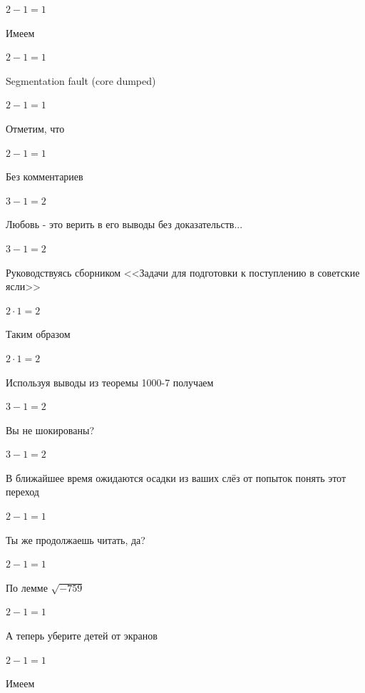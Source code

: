 \documentclass[12pt,a4paper,fleqn]{article}
\begin{document}
\begin{center}$2-1 = 1$\end{center}
Имеем

\begin{center}$2-1 = 1$\end{center}
Segmentation fault (core dumped)

\begin{center}$2-1 = 1$\end{center}
Отметим, что

\begin{center}$2-1 = 1$\end{center}
Без комментариев\cite{link4}

\begin{center}$3-1 = 2$\end{center}
Любовь - это верить в его выводы без доказательств...

\begin{center}$3-1 = 2$\end{center}
Руководствуясь сборником <<Задачи для подготовки к поступлению в советские ясли>>\cite{link1}

\begin{center}$2 \cdot 1 = 2$\end{center}
Таким образом

\begin{center}$2 \cdot 1 = 2$\end{center}
Используя выводы из теоремы 1000-7 получаем

\begin{center}$3-1 = 2$\end{center}
Вы не шокированы?\cite{link3}

\begin{center}$3-1 = 2$\end{center}
В ближайшее время ожидаются осадки из ваших слёз от попыток понять этот переход

\begin{center}$2-1 = 1$\end{center}
Ты же продолжаешь читать, да?

\begin{center}$2-1 = 1$\end{center}
По лемме $\sqrt{-759}$
\begin{center}$2-1 = 1$\end{center}
А теперь уберите детей от экранов

\begin{center}$2-1 = 1$\end{center}
Имеем
\end{document}
